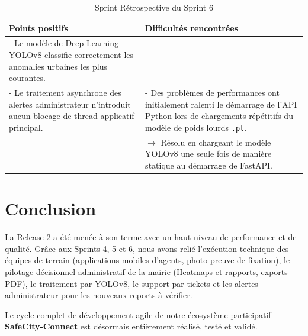 \begin{table}[H]
    \centering
    \caption{Sprint Rétrospective du Sprint 6}
    \label{tab:retro_sprint6}
    \vspace{0.2cm}
    \small
    \begin{tabularx}{\textwidth}{|X|X|}
        \hline
        \textbf{Points positifs} & \textbf{Difficultés rencontrées} \\ \hline
        - Le modèle de Deep Learning YOLOv8 classifie correctement les anomalies urbaines les plus courantes.\\
        - Le traitement asynchrone des alertes administrateur n'introduit aucun blocage de thread applicatif principal. & 
        - Des problèmes de performances ont initialement ralenti le démarrage de l'API Python lors de chargements répétitifs du modèle de poids lourds \texttt{.pt}.\\
        & $\rightarrow$ Résolu en chargeant le modèle YOLOv8 une seule fois de manière statique au démarrage de FastAPI. \\
        \hline
    \end{tabularx}
\end{table}

\section*{Conclusion}
La Release 2 a été menée à son terme avec un haut niveau de performance et de qualité. Grâce aux Sprints 4, 5 et 6, nous avons relié l'exécution technique des équipes de terrain (applications mobiles d'agents, photo preuve de fixation), le pilotage décisionnel administratif de la mairie (Heatmaps et rapports, exports PDF), le traitement par YOLOv8, le support par tickets et les alertes administrateur pour les nouveaux reports à vérifier.

Le cycle complet de développement agile de notre écosystème participatif \textbf{SafeCity-Connect} est désormais entièrement réalisé, testé et validé.
